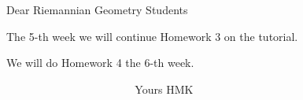
\centerline {Dear Riemannian Geometry Students}

  The 5-th week we will continue Homework 3 on the tutorial.

   We will do Homework 4 the 6-th week.

  $\qquad$ $\qquad$ $\qquad$ $\qquad$ $\qquad$
        Yours HMK


\bye


